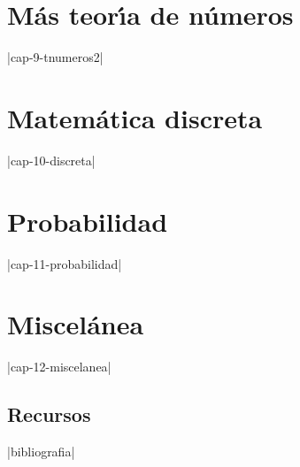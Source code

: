 \documentclass[9pt,a4paper,oldfontcommands,doubleside]{memoir} %
\begin{document}
\chapter{M\'as teor\'{\i}a de n\'umeros}
\monta|cap-9-tnumeros2|

\chapter{Matem\'atica discreta}\label{discr}
\monta|cap-10-discreta|




\chapter{Probabilidad}\label{prob}
\monta|cap-11-probabilidad|


\chapter{Miscel\'anea}
\monta|cap-12-miscelanea|





\begin{appendices}
\chapter{Recursos}
\monta|bibliografia|
\end{appendices}
\end{document}
